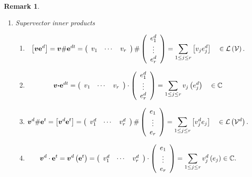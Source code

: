 \documentclass[aps,preprint]{revtex4}%
\newtheorem{remark}[theorem]{Remark}
\begin{document}
\begin{remark}
\begin{enumerate}
\item Supervector inner products

\begin{enumerate}
\item
\begin{equation}
\left[  \boldsymbol{v}\mathbf{e}^{d}\right]  =\boldsymbol{v}\#\mathbf{e}%
^{dt}=\left(
\begin{array}
[c]{ccc}%
v_{1} & \cdots & v_{r}%
\end{array}
\right)  \#\left(
\begin{array}
[c]{c}%
e_{1}^{d}\\
\vdots\\
e_{r}^{d}%
\end{array}
\right)  =\sum_{1\leq j\leq r}\left[  v_{j}e_{j}^{d}\right]  \quad
\in\mathcal{L}\left(  \mathcal{V}\right)  .
\end{equation}


\item
\begin{equation}
\boldsymbol{v\cdot}\mathbf{e}^{dt}=\left(
\begin{array}
[c]{ccc}%
v_{1} & \cdots & v_{r}%
\end{array}
\right)  \cdot\left(
\begin{array}
[c]{c}%
e_{1}^{d}\\
\vdots\\
e_{r}^{d}%
\end{array}
\right)  =\sum_{1\leq j\leq r}v_{j}\left(  e_{j}^{d}\right)  \quad
\in\mathbb{C}%
\end{equation}


\item
\begin{equation}
\boldsymbol{v}^{d}\#\mathbf{e}^{t}=\left[  \boldsymbol{v}^{d}\mathbf{e}%
^{t}\right]  =\left(
\begin{array}
[c]{ccc}%
v_{1}^{d} & \cdots & v_{r}^{d}%
\end{array}
\right)  \#\left(
\begin{array}
[c]{c}%
e_{1}\\
\vdots\\
e_{r}%
\end{array}
\right)  =\sum_{1\leq j\leq r}\left[  v_{j}^{d}e_{j}\right]  \quad
\in\mathcal{L}\left(  \mathcal{V}^{d}\right)  .
\end{equation}


\item
\begin{equation}
\boldsymbol{v}^{d}\cdot\mathbf{e}^{t}=\boldsymbol{v}^{d}\left(  \mathbf{e}%
^{t}\right)  =\left(
\begin{array}
[c]{ccc}%
v_{1}^{d} & \cdots & v_{r}^{d}%
\end{array}
\right)  \cdot\left(
\begin{array}
[c]{c}%
e_{1}\\
\vdots\\
e_{r}%
\end{array}
\right)  =\sum_{1\leq j\leq r}v_{j}^{d}\left(  e_{j}\right)  \in\mathbb{C}.
\end{equation}


\end{enumerate}
\end{enumerate}
\end{remark}
\end{document}

